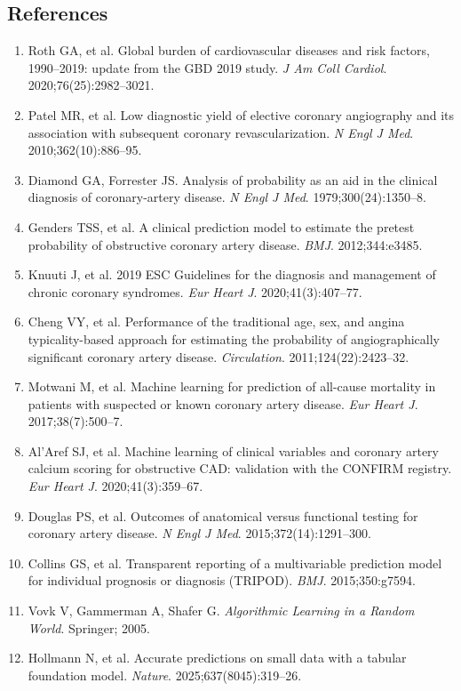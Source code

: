 \documentclass[english,11pt]{article}
\begin{document}
\subsection*{References}
\begin{enumerate}
\small
\item Roth GA, et al. Global burden of cardiovascular diseases and risk factors, 1990--2019: update from the GBD 2019 study. \emph{J Am Coll Cardiol}. 2020;76(25):2982--3021.
\item Patel MR, et al. Low diagnostic yield of elective coronary angiography and its association with subsequent coronary revascularization. \emph{N Engl J Med}. 2010;362(10):886--95.
\item Diamond GA, Forrester JS. Analysis of probability as an aid in the clinical diagnosis of coronary-artery disease. \emph{N Engl J Med}. 1979;300(24):1350--8.
\item Genders TSS, et al. A clinical prediction model to estimate the pretest probability of obstructive coronary artery disease. \emph{BMJ}. 2012;344:e3485.
\item Knuuti J, et al. 2019 ESC Guidelines for the diagnosis and management of chronic coronary syndromes. \emph{Eur Heart J}. 2020;41(3):407--77.
\item Cheng VY, et al. Performance of the traditional age, sex, and angina typicality-based approach for estimating the probability of angiographically significant coronary artery disease. \emph{Circulation}. 2011;124(22):2423--32.
\item Motwani M, et al. Machine learning for prediction of all-cause mortality in patients with suspected or known coronary artery disease. \emph{Eur Heart J}. 2017;38(7):500--7.
\item Al'Aref SJ, et al. Machine learning of clinical variables and coronary artery calcium scoring for obstructive CAD: validation with the CONFIRM registry. \emph{Eur Heart J}. 2020;41(3):359--67.
\item Douglas PS, et al. Outcomes of anatomical versus functional testing for coronary artery disease. \emph{N Engl J Med}. 2015;372(14):1291--300.
\item Collins GS, et al. Transparent reporting of a multivariable prediction model for individual prognosis or diagnosis (TRIPOD). \emph{BMJ}. 2015;350:g7594.
\item Vovk V, Gammerman A, Shafer G. \emph{Algorithmic Learning in a Random World}. Springer; 2005.
\item Hollmann N, et al. Accurate predictions on small data with a tabular foundation model. \emph{Nature}. 2025;637(8045):319--26.

\end{enumerate}
\end{document}
